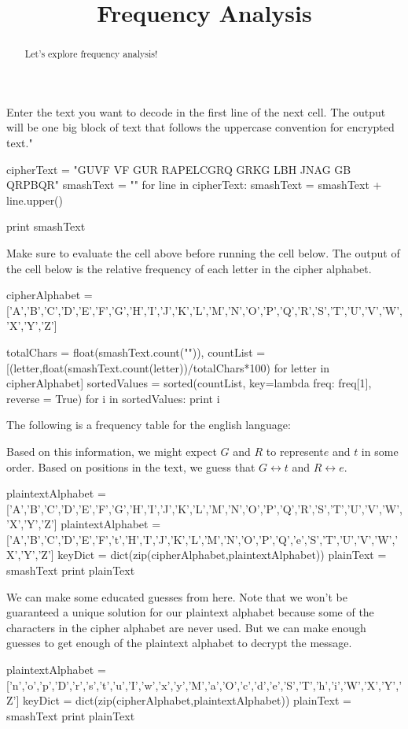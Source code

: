 \documentclass[handout]{ximera}
\title{Frequency Analysis}
\begin{document}
\begin{abstract}{Let's explore frequency analysis!}\end{abstract}
\maketitle

Enter the text you want to decode in the first line of the next cell.  The output will be one big block of text that follows the uppercase convention for encrypted text."

\begin{python}
cipherText = "GUVF VF GUR RAPELCGRQ GRKG LBH JNAG GB QRPBQR"
smashText =  ""
for line in cipherText:
	smashText = smashText + line.upper()
	
print smashText
\end{python}
Make sure to evaluate the cell above before running the cell below.  The output of the cell below is the relative frequency of each letter in the cipher alphabet.

\begin{python}
cipherAlphabet = ['A','B','C','D','E','F','G','H','I','J','K','L','M','N','O','P','Q','R','S','T','U','V','W','X','Y','Z']

totalChars = float(smashText.count("")),
countList = [(letter,float(smashText.count(letter))/totalChars*100) for letter in cipherAlphabet]
sortedValues = sorted(countList, key=lambda freq: freq[1], reverse = True)
for i in sortedValues:
	print i
\end{python}

The following is a frequency table for the english language:


Based on this information, we might expect $G$ and $R$ to represent$ e$ and $t$ in some order.  Based on positions in the text, we guess that $G \leftrightarrow t$ and $R \leftrightarrow e$.

\begin{python}
plaintextAlphabet = ['A','B','C','D','E','F','G','H','I','J','K','L','M','N','O','P','Q','R','S','T','U','V','W','X','Y','Z']
plaintextAlphabet = ['A','B','C','D','E','F','t','H','I','J','K','L','M','N','O','P','Q','e','S','T','U','V','W','X','Y','Z']
keyDict = dict(zip(cipherAlphabet,plaintextAlphabet))
plainText = smashText
print plainText
\end{python}

We can make some educated guesses from here. Note that we won't be guaranteed a unique solution for our plaintext alphabet because some of the characters in the cipher alphabet are never used.  But we can make enough guesses to get enough of the plaintext alphabet to decrypt the message.
  
\begin{python}
plaintextAlphabet = ['n','o','p','D','r','s','t','u','I','w','x','y','M','a','O','c','d','e','S','T','h','i','W','X','Y','Z']
keyDict = dict(zip(cipherAlphabet,plaintextAlphabet))
plainText = smashText
print plainText
\end{python}
\end{document}
